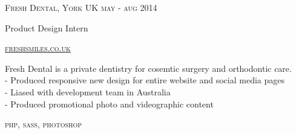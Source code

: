 {
  \textsc{\small{Fresh Dental, York UK
      \hfill
          {\raggedleft
              may - aug 2014
          } \\
      }
  }
  {\raggedright\large {
    Product Design Intern
  } \\}

  \textsc{\small\href{http://www.freshsmiles.co.uk}{freshsmiles.co.uk}}

  \normalsize{
    Fresh Dental is a private dentistry for cosemtic surgery and orthodontic care. \\
    - Produced responsive new design for entire website and social media pages \\
    - Liased with development team in Australia \\
    - Produced promotional photo and videographic content
  }

  \textsc{\small{\color{highlight}
    php,
    sass,
    photoshop
  }}
}
